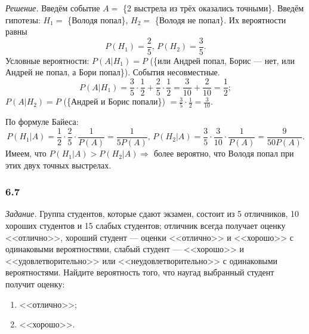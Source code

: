 \textit{Решение.} Введём событие $A =$ \{2 выстрела из трёх оказались точными\}.
Введём гипотезы: $H_1 =$ \{Володя попал\}, $H_2 =$ \{Володя не попал\}.
Их вероятности равны
$$P \left( H_1 \right) =
\frac{2}{5}, \,
P \left( H_2 \right) =
\frac{3}{5}.$$
Условные вероятности: $P \left( \left. A \right| H_1 \right) = P$ (\{или Андрей попал, Борис --- нет, или Андрей не попал, а Бори попал\}).
События несовместные.
$$P \left( \left. A \right| H_1 \right) =
\frac{3}{5} \cdot \frac{1}{2} + \frac{2}{5} \cdot \frac{1}{2} =
\frac{3}{10} + \frac{2}{10} =
\frac{1}{2};$$
$P \left( \left. A \right| H_2 \right) = P$ (\{Андрей и Борис попали\}) $= \frac{3}{5} \cdot \frac{1}{2} = \frac{3}{10}.$

По формуле Байеса:
$$P \left( \left. H_1 \right| A \right) =
\frac{1}{2} \cdot \frac{2}{5} \cdot \frac{1}{P \left( A \right) } =
\frac{1}{5P \left( A \right) }, \,
P \left( \left. H_2 \right| A \right) =
\frac{3}{5} \cdot \frac{3}{10} \cdot \frac{1}{P \left( A \right) } =
\frac{9}{50 P \left( A \right) }.$$
Имеем, что $P \left( \left. H_1 \right| A \right) > P \left( \left. H_2 \right| A \right) \Rightarrow $ более вероятно,
что Володя попал при этих двух точных выстрелах.

\subsubsection*{6.7}

\textit{Задание.}
Группа студентов, которые сдают экзамен,
состоит из 5 отличников,
10 хороших студентов и 15 слабых студентов;
отличник всегда получает оценку <<отлично>>,
хороший студент ---
оценки <<отлично>> и <<хорошо>> с одинаковыми вероятностями,
слабый студент --- <<хорошо>> и <<удовлетворительно>> или <<неудовлетворительно>> с одинаковыми вероятностями.
Найдите вероятность того, что наугад выбранный студент получит оценку:
\begin{enumerate}[label=\alph*)]
\item <<отлично>>;
\item <<хорошо>>.
\end{enumerate}

